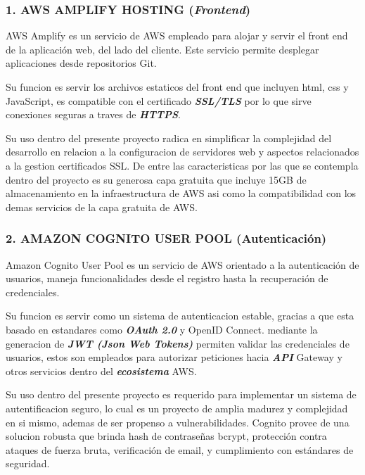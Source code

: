 \subsubsection{1. AWS AMPLIFY HOSTING (\textbf{\textit{Frontend}})}

AWS Amplify es un servicio de AWS empleado para alojar y servir el front end de la aplicación web, del lado del cliente. Este servicio permite desplegar aplicaciones desde repositorios Git.

Su funcion es servir los archivos estaticos del front end que incluyen html, css y JavaScript, es compatible con el certificado \textbf{\textit{SSL/TLS}} por lo que sirve conexiones seguras a traves de \textbf{\textit{HTTPS}}. 

Su uso dentro del presente proyecto radica en simplificar la complejidad del desarrollo en relacion a la configuracion de servidores web y aspectos relacionados a la gestion certificados SSL. De entre las caracteristicas por las que se contempla dentro del proyecto es su generosa capa gratuita que incluye 15GB de almacenamiento en la infraestructura de AWS asi como la compatibilidad con los demas servicios de la capa gratuita de AWS. 

\subsubsection{2. AMAZON COGNITO USER POOL (Autenticación)}

Amazon Cognito User Pool es un servicio de AWS orientado a la autenticación de usuarios, maneja funcionalidades desde el registro hasta la recuperación de credenciales.

Su funcion es servir como un sistema de autenticacion estable, gracias a que esta basado en estandares como \textbf{\textit{OAuth 2.0}} y OpenID Connect. mediante la generacion de \textbf{\textit{JWT (Json Web Tokens)}} permiten validar las credenciales de usuarios, estos son empleados para autorizar peticiones hacia \textbf{\textit{API}} Gateway y otros servicios dentro del \textbf{\textit{ecosistema}} AWS. 

Su uso dentro del presente proyecto es requerido para implementar un sistema de autentificacion seguro, lo cual es un proyecto de amplia madurez y complejidad en si mismo, ademas de ser propenso a vulnerabilidades. Cognito provee de una solucion robusta que brinda hash de contraseñas bcrypt, protección contra ataques de fuerza bruta, verificación de email, y cumplimiento con estándares de seguridad.

